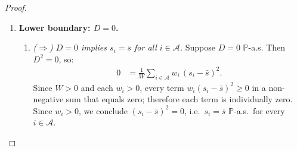 \documentclass[12pt,openany]{book}
\newcommand{\calF}{\mathcal{F}}
\newcommand{\Prob}{\mathbb{P}}
\numberwithin{equation}{chapter}
\theoremstyle{plain}
\theoremstyle{definition}
\theoremstyle{remark}
\numberwithin{equation}{chapter}
\theoremstyle{plain}
\begin{document}
\begin{proof}
\begin{enumerate}
  \begin{enumerate}
    \item \emph{Measurability of inputs.}
      By Assumption~\ref{asm:return-process} and the
      definition of the agent scoring model, each score
      $s_i$ and weight $w_i$ is $\calF_t$-measurable for
      every $i \in \mathcal{A}$.

    \item \emph{Measurability of $W$.}
      $W = \sum_{i \in \mathcal{A}} w_i$ is a finite sum of
      $\calF_t$-measurable functions, hence $\calF_t$-measurable.
      Since $W > 0$ $\Prob$-a.s.\ (Assumption~\ref{asm:active-agents}),
      $1/W$ is also $\calF_t$-measurable.

    \item \emph{Measurability of $\bar{s}$.}
      \begin{align}
        \bar{s}
          &= \frac{1}{W}\sum_{i \in \mathcal{A}} w_i\, s_i
      \end{align}
      is a finite linear combination of products of
      $\calF_t$-measurable functions, hence
      $\calF_t$-measurable.

    \item \emph{Measurability of $D$.}
      Each $(s_i - \bar{s})^2$ is $\calF_t$-measurable
      (difference and square of measurable functions).
      The finite weighted sum and subsequent square root
      (applied to a non-negative measurable function)
      preserve $\calF_t$-measurability.  Hence $D$ is
      $\calF_t$-measurable.
  \end{enumerate}

  \item \textbf{Lower boundary: $D = 0$.}

  \begin{enumerate}
    \item \emph{($\Rightarrow$) $D = 0$ implies
      $s_i = \bar{s}$ for all $i \in \mathcal{A}$.}
      Suppose $D = 0$ $\Prob$-a.s.  Then $D^2 = 0$, so:
      \begin{align}
        0
          &= \frac{1}{W}\sum_{i \in \mathcal{A}}
              w_i\,(s_i - \bar{s})^2.
      \end{align}
      Since $W > 0$ and each $w_i > 0$, every term
      $w_i(s_i - \bar{s})^2 \geq 0$ in a non-negative
      sum that equals zero; therefore each term is
      individually zero.  Since $w_i > 0$, we conclude
      $(s_i - \bar{s})^2 = 0$, i.e.\
      $s_i = \bar{s}$ $\Prob$-a.s.\ for every
      $i \in \mathcal{A}$.


\end{enumerate}
\end{enumerate}
\end{proof}
\end{document}
